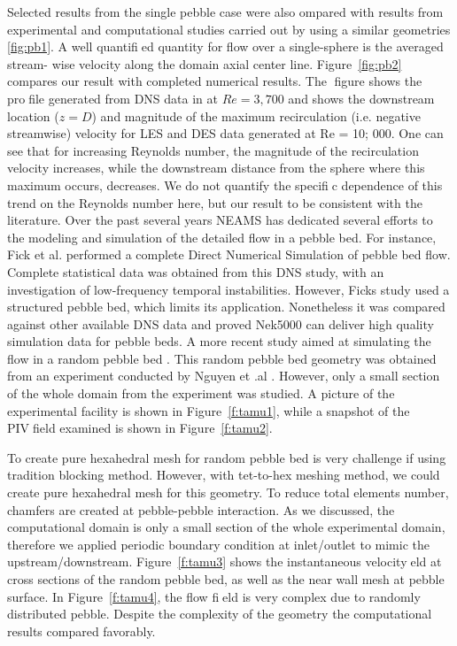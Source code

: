 Selected results from the single pebble case were also ompared with results from experimental and computational studies carried out by using a similar geometries \ref{fig:pb1}. A well quantified quantity for flow over a single-sphere is the averaged stream- wise velocity along the domain axial center line. Figure~\ref{fig:pb2} compares our result with completed numerical results. The figure shows the profile generated from DNS data in \cite{fick2017investigation} at $Re = 3,700$ and shows the downstream location ($z=D$) and magnitude of the maximum recirculation (i.e. negative streamwise) velocity for LES and DES data generated at Re = 10; 000. One can see that for increasing Reynolds number, the magnitude of the recirculation velocity increases, while the downstream distance from the sphere where this maximum occurs, decreases. We do not quantify the specific dependence of this trend on the Reynolds number here, but our result to be consistent with the literature.
Over the past several years NEAMS has dedicated several efforts to the modeling and simulation of the detailed flow in a pebble bed. For instance, Fick et al. \cite{fick2017direct}  performed a complete Direct Numerical Simulation of pebble bed flow. Complete statistical data was obtained from this DNS study, with an investigation of low-frequency temporal instabilities. However, Ficks study \cite{fick2017direct} used a structured pebble bed, which limits its application. Nonetheless it was compared against other available DNS data and proved Nek5000 can deliver high quality simulation data for pebble beds. A more recent study aimed at simulating the flow in a random pebble bed \cite{yildiz2020direct}. This random pebble bed geometry was obtained from an experiment conducted by Nguyen et .al \cite{nguyen2018time}. However, only a small section of the whole domain from the experiment was studied. A picture of the experimental facility is shown in Figure~\ref{f:tamu1}, while a snapshot of the PIVfield examined is shown in Figure~\ref{f:tamu2}.

To create pure hexahedral mesh for random pebble bed is very challenge if using tradition blocking method. However, with tet-to-hex meshing method, we could create pure hexahedral mesh for this geometry. To reduce total elements number, chamfers are created at pebble-pebble interaction. As we discussed, the computational domain is only a small section of the whole experimental domain, therefore we applied periodic boundary condition at inlet/outlet to mimic the upstream/downstream. Figure~\ref{f:tamu3} shows the instantaneous velocityeld at cross sections of the random pebble bed, as well as the near wall mesh at pebble surface. In Figure~\ref{f:tamu4}, the flow field is very complex due to randomly distributed pebble. Despite the complexity of the geometry  the computational results compared favorably.


